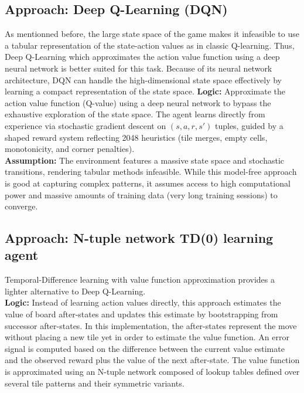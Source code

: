 \documentclass[letterpaper]{article} %
\begin{document}
\subsection{Approach: Deep Q-Learning (DQN)}
As mentionned before, the large state space of the game makes it infeasible to use a tabular representation of the state-action values as in classic Q-learning.
Thus, Deep Q-Learning\cite{noauthor_reinforcement_nodate} which approximates the action value function using a deep neural network is better suited for this task.
Because of its neural network architecture\cite{chan_playing_2022}, DQN can handle the high-dimensional state space effectively by learning a compact representation of the state space.
\textbf{Logic:} Approximate the action value function (Q-value) using a deep neural network to bypass the exhaustive exploration of the state space.
The agent learns directly from experience via stochastic gradient descent on $(s, a, r, s')$ tuples, guided by a shaped reward system reflecting 2048 heuristics (tile merges, empty cells, monotonicity, and corner penalties). \\
\textbf{Assumption:} The environment features a massive state space and stochastic transitions, rendering tabular methods infeasible. 
While this model-free approach is good at capturing complex patterns, it assumes access to high computational power and massive amounts of training data (very long training sessions) to converge.

\subsection{Approach: N-tuple network TD(0) learning agent}
Temporal-Difference learning with value function approximation provides a lighter alternative to Deep Q-Learning. \\
\textbf{Logic:} Instead of learning action values directly, this approach estimates the value of board after-states and updates this estimate by bootstrapping 
from successor after-states. In this implementation, the after-states represent the move without placing a new tile yet in order to estimate the value function.
An error signal is computed based on the difference between the current value estimate and the observed reward plus the value of the next after-state. 
The value function is approximated using an N-tuple network composed of lookup tables defined over several tile patterns and their symmetric variants. \cite{guei_moporgictdl2048-demo_2026}
\end{document}
